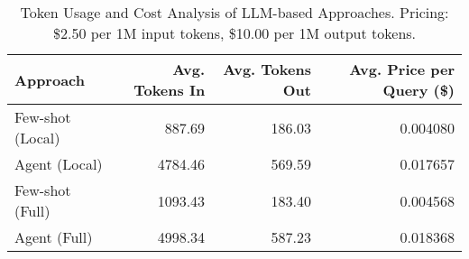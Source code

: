 \begin{table}[htbp]
\centering
\caption{Token Usage and Cost Analysis of LLM-based Approaches. Pricing: \$2.50 per 1M input tokens, \$10.00 per 1M output tokens.}
\label{tab:llm_cost}
\begin{tabular}{lrrr}
\hline
\textbf{Approach} & \textbf{Avg. Tokens In} & \textbf{Avg. Tokens Out} & \textbf{Avg. Price per Query (\$)} \\
\hline
Few-shot (Local) & 887.69 & 186.03 & 0.004080 \\
Agent (Local) & 4784.46 & 569.59 & 0.017657 \\
Few-shot (Full) & 1093.43 & 183.40 & 0.004568 \\
Agent (Full) & 4998.34 & 587.23 & 0.018368 \\
\hline
\end{tabular}
\end{table}